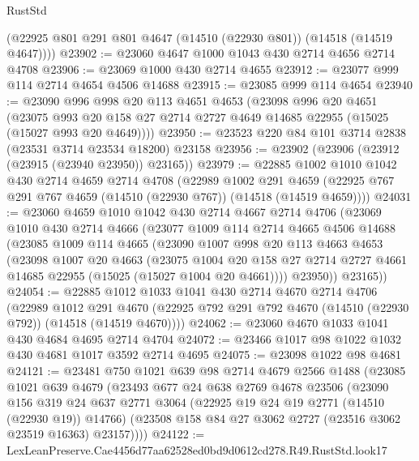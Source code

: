 \begin{lexlean}{RustStd}
\begin{coremodule}
      (@22925 @801 @291 @801 @4647 (@14510 (@22930 @801)) (@14518 (@14519 @4647))))
@23902 := @23060 @4647 @1000 @1043 @430 @2714 @4656 @2714 @4708
@23906 := @23069 @1000 @430 @2714 @4655
@23912 := @23077 @999 @114 @2714 @4654 @4506 @14688
@23915 := @23085 @999 @114 @4654
@23940 := @23090
    @996
    @998
    @20
    @113
    @4651
    @4653
    (@23098
      @996
      @20
      @4651
      (@23075 @993 @20 @158 @27 @2714 @2727 @4649 @14685 @22955 (@15025 (@15027 @993 @20 @4649))))
@23950 := @23523 @220 @84 @101 @3714 @2838 (@23531 @3714 @23534 @18200) @23158
@23956 := @23902 (@23906 (@23912 (@23915 (@23940 @23950)) @23165))
@23979 := @22885
    @1002
    @1010
    @1042
    @430
    @2714
    @4659
    @2714
    @4708
    (@22989
      @1002
      @291
      @4659
      (@22925 @767 @291 @767 @4659 (@14510 (@22930 @767)) (@14518 (@14519 @4659))))
@24031 := @23060
    @4659
    @1010
    @1042
    @430
    @2714
    @4667
    @2714
    @4706
    (@23069
      @1010
      @430
      @2714
      @4666
      (@23077
        @1009
        @114
        @2714
        @4665
        @4506
        @14688
        (@23085
          @1009
          @114
          @4665
          (@23090
            @1007
            @998
            @20
            @113
            @4663
            @4653
            (@23098
              @1007
              @20
              @4663
              (@23075
                @1004
                @20
                @158
                @27
                @2714
                @2727
                @4661
                @14685
                @22955
                (@15025 (@15027 @1004 @20 @4661))))
            @23950))
        @23165))
@24054 := @22885
    @1012
    @1033
    @1041
    @430
    @2714
    @4670
    @2714
    @4706
    (@22989
      @1012
      @291
      @4670
      (@22925 @792 @291 @792 @4670 (@14510 (@22930 @792)) (@14518 (@14519 @4670))))
@24062 := @23060 @4670 @1033 @1041 @430 @4684 @4695 @2714 @4704
@24072 := @23466 @1017 @98 @1022 @1032 @430 @4681 @1017 @3592 @2714 @4695
@24075 := @23098 @1022 @98 @4681
@24121 := @23481
    @750
    @1021
    @639
    @98
    @2714
    @4679
    @2566
    @1488
    (@23085
      @1021
      @639
      @4679
      (@23493
        @677
        @24
        @638
        @2769
        @4678
        @23506
        (@23090
          @156
          @319
          @24
          @637
          @2771
          @3064
          (@22925 @19 @24 @19 @2771 (@14510 (@22930 @19)) @14766)
          (@23508 @158 @84 @27 @3062 @2727 (@23516 @3062 @23519 @16363) @23157))))
@24122 := LexLeanPreserve.Cae4456d77aa62528ed0bd9d0612cd278.R49.RustStd.look17

\end{coremodule}
\end{lexlean}
